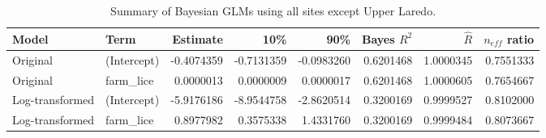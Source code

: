 \begin{table}
\centering
\caption{Summary of Bayesian GLMs using all sites except Upper Laredo.}
\centering
\begin{tabular}[t]{llrrrrrr}
\toprule
Model & Term & Estimate & 10\% & 90\% & Bayes $R^2$ & $\hat{R}$ & $n_{eff}$ ratio\\
\midrule
Original & (Intercept) & -0.4074359 & -0.7131359 & -0.0983260 & 0.6201468 & 1.0000345 & 0.7551333\\
Original & farm_lice & 0.0000013 & 0.0000009 & 0.0000017 & 0.6201468 & 1.0000605 & 0.7654667\\
Log-transformed & (Intercept) & -5.9176186 & -8.9544758 & -2.8620514 & 0.3200169 & 0.9999527 & 0.8102000\\
Log-transformed & farm_lice & 0.8977982 & 0.3575338 & 1.4331760 & 0.3200169 & 0.9999484 & 0.8073667\\
\bottomrule
\end{tabular}
\end{table}
